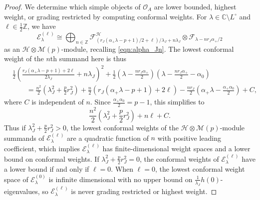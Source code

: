 \documentclass[11pt, reqno]{amsart}
\theoremstyle{definition}\newtheorem{defi}[thm]{Definition}
\theoremstyle{definition}\newtheorem{rem}[thm]{Remark}
\theoremstyle{definition}\newtheorem{exam}[thm]{Example}
\theoremstyle{definition}\newtheorem{assum}[thm]{Assumption}
\newcommand{\cE}{\mathcal{E}}
\newcommand{\cH}{\mathcal{H}}
\newcommand{\cM}{\mathcal{M}}
\newcommand{\cF}{\mathcal{F}}
\newcommand{\cO}{\mathcal{O}}
\newcommand{\CC}{\mathbb{C}}
\newcommand{\ZZ}{\mathbb{Z}}
\begin{document}
\begin{proof}
We determine which simple objects of $\cO_A$ are lower bounded, highest weight, or grading restricted by computing conformal weights. For $\lambda\in\CC\setminus L^\circ$ and $\ell\in\frac{1}{2}\ZZ$, we have
\begin{equation*}
\cE^{(\ell)}_{\lambda} \cong\bigoplus_{n\in\ZZ} \cF^\cH_{(r_J(\alpha_+\lambda-p+1)/2+\ell)/\lambda_J+n\lambda_J}\otimes\cF_{\lambda-nr_J\alpha_+/2}
\end{equation*}
as an $\cH\otimes\cM(p)$-module, recalling \eqref{eqn:alpha_Jn}. The lowest conformal weight of the $n$th summand here is thus
\begin{align}\label{eqn:h(lambda_ell_n)}
&\frac{1}{2}\left(\frac{r_J(\alpha_+\lambda-p+1)+2\ell}{2\lambda_J}+n\lambda_J\right)^2+\frac{1}{2}\left(\lambda-\frac{nr_J\alpha_+}{2}\right)\left(\lambda-\frac{nr_J\alpha_+}{2}-\alpha_0\right)\nonumber\\
&\hspace{2em}=\frac{n^2}{2}\left(\lambda_J^2+\frac{p}{2}r_J^2\right)+\frac{n}{2}\left(r_J(\alpha_+\lambda-p+1)+2\ell\right)-\frac{n r_J}{2}\left(\alpha_+\lambda-\frac{\alpha_+\alpha_0}{2}\right)+C,
\end{align}
where $C$ is independent of $n$. Since $\frac{\alpha_+\alpha_0}{2}=p-1$, this simplifies to 
\begin{equation*}
\frac{n^2}{2}\left(\lambda_J^2+\frac{p}{2}r_J^2\right)+n\ell+C.
\end{equation*}
Thus if $\lambda_J^2+\frac{p}{2}r_J^2>0$, the lowest conformal weights of the $\cH\otimes\cM(p)$-module summands of $\cE_{\lambda}^{(\ell)}$ are a quadratic function of $n$ with positive leading coefficient, which implies $\cE_{\lambda}^{(\ell)}$ has finite-dimensional weight spaces and a lower bound on conformal weights. If $\lambda_J^2+\frac{p}{2}r_J^2=0$, the conformal weights of $\cE_\lambda^{(\ell)}$ have a lower bound if and only if $\ell=0$. When $\ell=0$, the lowest conformal weight space of $\cE_\lambda^{(0)}$ is infinite dimensional with no upper bound on $\frac{1}{\lambda_J}h(0)$-eigenvalues, so $\cE_\lambda^{(\ell)}$ is never grading restricted or highest weight.


\end{proof}
\end{document}
